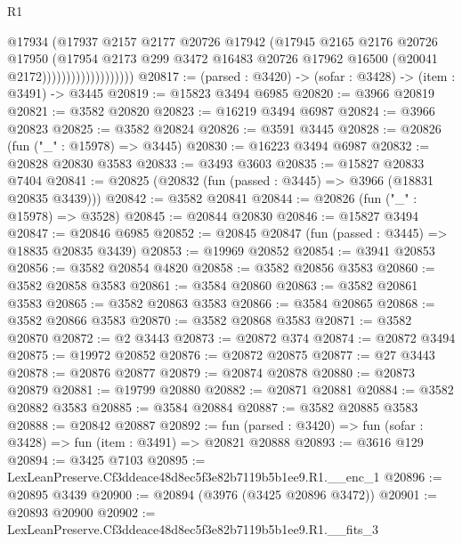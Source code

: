 \begin{lexlean}{R1}
\begin{coremodule}
                                  @17934
                                  (@17937
                                    @2157
                                    @2177
                                    @20726
                                    @17942
                                    (@17945
                                      @2165
                                      @2176
                                      @20726
                                      @17950
                                      (@17954
                                        @2173
                                        @299
                                        @3472
                                        @16483
                                        @20726
                                        @17962
                                        @16500
                                        (@20041 @2172)))))))))))))))))))
@20817 := (parsed : @3420) -> (sofar : @3428) -> (item : @3491) -> @3445
@20819 := @15823 @3494 @6985
@20820 := @3966 @20819
@20821 := @3582 @20820
@20823 := @16219 @3494 @6987
@20824 := @3966 @20823
@20825 := @3582 @20824
@20826 := @3591 @3445
@20828 := @20826 (fun ("_" : @15978) => @3445)
@20830 := @16223 @3494 @6987
@20832 := @20828 @20830 @3583
@20833 := @3493 @3603
@20835 := @15827 @20833 @7404
@20841 := @20825 (@20832 (fun (passed : @3445) => @3966 (@18831 @20835 @3439)))
@20842 := @3582 @20841
@20844 := @20826 (fun ("_" : @15978) => @3528)
@20845 := @20844 @20830
@20846 := @15827 @3494
@20847 := @20846 @6985
@20852 := @20845 @20847 (fun (passed : @3445) => @18835 @20835 @3439)
@20853 := @19969 @20852
@20854 := @3941 @20853
@20856 := @3582 @20854 @4820
@20858 := @3582 @20856 @3583
@20860 := @3582 @20858 @3583
@20861 := @3584 @20860
@20863 := @3582 @20861 @3583
@20865 := @3582 @20863 @3583
@20866 := @3584 @20865
@20868 := @3582 @20866 @3583
@20870 := @3582 @20868 @3583
@20871 := @3582 @20870
@20872 := @2 @3443
@20873 := @20872 @374
@20874 := @20872 @3494
@20875 := @19972 @20852
@20876 := @20872 @20875
@20877 := @27 @3443
@20878 := @20876 @20877
@20879 := @20874 @20878
@20880 := @20873 @20879
@20881 := @19799 @20880
@20882 := @20871 @20881
@20884 := @3582 @20882 @3583
@20885 := @3584 @20884
@20887 := @3582 @20885 @3583
@20888 := @20842 @20887
@20892 := fun (parsed : @3420) => fun (sofar : @3428) => fun (item : @3491) => @20821 @20888
@20893 := @3616 @129
@20894 := @3425 @7103
@20895 := LexLeanPreserve.Cf3ddeace48d8ec5f3e82b7119b5b1ee9.R1.__enc_1
@20896 := @20895 @3439
@20900 := @20894 (@3976 (@3425 @20896 @3472))
@20901 := @20893 @20900
@20902 := LexLeanPreserve.Cf3ddeace48d8ec5f3e82b7119b5b1ee9.R1.__fits_3

\end{coremodule}
\end{lexlean}
